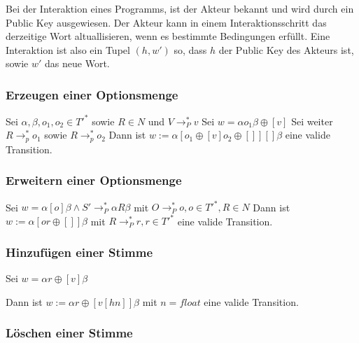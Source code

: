 \documentclass[]{article}
\begin{document}
Bei der Interaktion eines Programms, ist der Akteur bekannt und wird
durch ein Public Key ausgewiesen. Der Akteur kann in einem
Interaktionsschritt das derzeitige Wort altuallisieren, wenn es
bestimmte Bedingungen erfüllt. Eine Interaktion ist also ein Tupel
$(h,w')$ so, dass $h$ der Public Key des Akteurs ist, sowie $w'$ das
neue Wort.

\subsubsection*{Erzeugen einer Optionsmenge}


% 


Sei $\alpha,\beta,o_1,o_2 \in T'^*$ sowie $R\in N$ und
$V \rightarrow_P^* v$ Sei $w=\alpha o_1 \beta \oplus [v]$ Sei weiter
$R\rightarrow_p^* o_1$ sowie $R\rightarrow_p^* o_2$ Dann ist
$w:=\alpha [o_1\oplus [v] o_2\oplus []][]\beta$ eine valide Transition.

\subsubsection*{Erweitern einer Optionsmenge}

Sei $w=\alpha[o]\beta \land S'\rightarrow_P^* \alpha R \beta$ mit
$O\rightarrow_P^* o, o\in T'^*, R\in N$ Dann ist
$w:=\alpha[o r\oplus []]\beta$ mit $R \rightarrow_P^* r, r\in T'^*$ eine
valide Transition.

\subsubsection*{Hinzufügen einer Stimme}

Sei $w=\alpha r\oplus [v]\beta$

Dann ist $w:=\alpha r \oplus [v[h n]]\beta$ mit $n=float$ eine valide
Transition.

\subsubsection*{Löschen einer Stimme}
\end{document}
